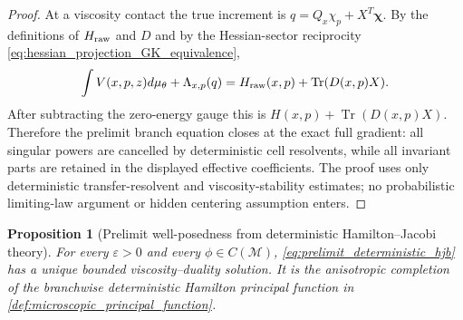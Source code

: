 \documentclass[12pt, letterpaper]{amsart}
\newcommand{\Mcal}{\mathcal{M}}
\providecommand{\Tr}{\operatorname{Tr}}
\theoremstyle{plain}
\newtheorem{proposition}[theorem]{Proposition}
\theoremstyle{definition}
\theoremstyle{remark}
\begin{document}
\begin{proof}
At a viscosity contact the true increment is
$q=Q_x\chi_p+X^T\boldsymbol\chi$.  By the definitions of
$H_{\rm raw}$ and $D$ and by the Hessian-sector reciprocity
\eqref{eq:hessian_projection_GK_equivalence},
\begin{equation}
    \int V(x,p,z)d\mu_\theta+\Lambda_{x,p}(q)
    =H_{\rm raw}(x,p)+\Tr(D(x,p)X).
\end{equation}
After subtracting the zero-energy gauge this is
$H(x,p)+\Tr(D(x,p)X)$.  Therefore the prelimit branch equation closes at the
exact full gradient: all singular powers are cancelled by deterministic cell
resolvents, while all invariant parts are retained in the displayed effective
coefficients.  The proof uses only deterministic transfer-resolvent and
viscosity-stability estimates; no probabilistic limiting-law argument or hidden
centering assumption enters.
\end{proof}


\begin{proposition}[Prelimit well-posedness from deterministic Hamilton--Jacobi theory]
\label{prop:prelimit_wellposedness}
For every $\varepsilon>0$ and every $\phi\in C(\Mcal)$,
\eqref{eq:prelimit_deterministic_hjb} has a unique bounded viscosity--duality
solution.  It is the anisotropic completion of the branchwise deterministic
Hamilton principal function in \cref{def:microscopic_principal_function}.
\end{proposition}
\end{document}
